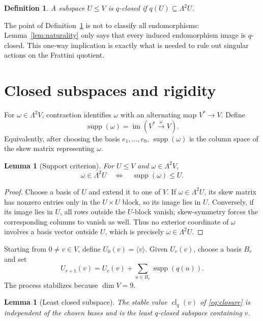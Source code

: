 \documentclass[10pt,a4paper]{amsart}
\newtheorem{lemma}[theorem]{Lemma}
\newtheorem{definition}[theorem]{Definition}
\newcommand{\im}{\operatorname{im}}
\newcommand{\supp}{\operatorname{supp}}
\newcommand{\clq}{\operatorname{cl}_q}
\begin{document}
\begin{definition}\label{def:closed}
A subspace $U\leq V$ is \emph{$q$-closed} if
$q(U)\subseteq\Lambda^2U$.
\end{definition}

The point of Definition~\ref{def:closed} is not to classify all
endomorphisms: Lemma~\ref{lem:naturality} only says that every induced
endomorphism image is $q$-closed.  This one-way implication is exactly
what is needed to rule out singular actions on the Frattini quotient.

\section{Closed subspaces and rigidity}\label{sec:rigidity}

For $\omega\in\Lambda^2V$, contraction identifies $\omega$ with an
alternating map $V^*\to V$.  Define
\[
                    \supp(\omega)=\im(V^*\xrightarrow{\ \omega\ }V).
\]
Equivalently, after choosing the basis $e_1,\ldots,e_9$,
$\supp(\omega)$ is the column space of the skew matrix representing
$\omega$.

\begin{lemma}[Support criterion]\label{lem:support}
For $U\leq V$ and $\omega\in\Lambda^2V$,
\[
                \omega\in\Lambda^2U
       \quad\Longleftrightarrow\quad
                \supp(\omega)\leq U.
\]
\end{lemma}

\begin{proof}
Choose a basis of $U$ and extend it to one of $V$.  If
$\omega\in\Lambda^2U$, its skew matrix has nonzero entries only in the
$U\times U$ block, so its image lies in $U$.  Conversely, if its image
lies in $U$, all rows outside the $U$-block vanish; skew-symmetry forces
the corresponding columns to vanish as well.  Thus no exterior coordinate
of $\omega$ involves a basis vector outside $U$, which is precisely
$\omega\in\Lambda^2U$.
\end{proof}

Starting from $0\neq v\in V$, define $U_0(v)=\langle v\rangle$.  Given
$U_r(v)$, choose a basis $B_r$ and set
\begin{equation}\label{eq:closure}
 U_{r+1}(v)=U_r(v)+\sum_{u\in B_r}\supp(q(u)).
\end{equation}
The process stabilizes because $\dim V=9$.

\begin{lemma}[Least closed subspace]\label{lem:closure}
The stable value $\clq(v)$ of \eqref{eq:closure} is independent of the
chosen bases and is the least $q$-closed subspace containing $v$.
\end{lemma}
\end{document}

